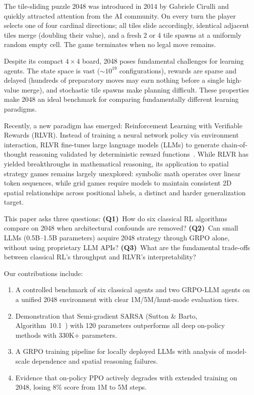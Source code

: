 \documentclass[letterpaper]{article}
\begin{document}
The tile-sliding puzzle 2048 was introduced in 2014 by Gabriele Cirulli and quickly attracted attention from the AI community. On every turn the player selects one of four cardinal directions; all tiles slide accordingly, identical adjacent tiles merge (doubling their value), and a fresh 2 or 4 tile spawns at a uniformly random empty cell. The game terminates when no legal move remains.

Despite its compact $4{\times}4$ board, 2048 poses fundamental challenges for learning agents. The state space is vast (${\sim}10^{19}$ configurations), rewards are sparse and delayed (hundreds of preparatory moves may earn nothing before a single high-value merge), and stochastic tile spawns make planning difficult. These properties make 2048 an ideal benchmark for comparing fundamentally different learning paradigms.

Recently, a new paradigm has emerged: Reinforcement Learning with Verifiable Rewards (RLVR). Instead of training a neural network policy via environment interaction, RLVR fine-tunes large language models (LLMs) to generate chain-of-thought reasoning validated by deterministic reward functions~\cite{guo2025deepseek, wen2025rlvr}. While RLVR has yielded breakthroughs in mathematical reasoning, its application to spatial strategy games remains largely unexplored: symbolic math operates over linear token sequences, while grid games require models to maintain consistent 2D spatial relationships across positional labels, a distinct and harder generalization target.

This paper asks three questions: \textbf{(Q1)}~How do six classical RL algorithms compare on 2048 when architectural confounds are removed? \textbf{(Q2)}~Can small LLMs (0.5B--1.5B parameters) acquire 2048 strategy through GRPO alone, without using proprietary LLM APIs? \textbf{(Q3)}~What are the fundamental trade-offs between classical RL's throughput and RLVR's interpretability?

Our contributions include:
\begin{enumerate}
    \item A controlled benchmark of six classical agents and two GRPO-LLM agents on a unified 2048 environment with clear 1M/5M/hunt-mode evaluation tiers.
    \item Demonstration that Semi-gradient SARSA (Sutton \& Barto, Algorithm~10.1~\cite{sutton2018rl}) with 120 parameters outperforms all deep on-policy methods with 330K+ parameters.
    \item A GRPO training pipeline for locally deployed LLMs with analysis of model-scale dependence and spatial reasoning failures.
    \item Evidence that on-policy PPO actively degrades with extended training on 2048, losing 8\% score from 1M to 5M steps.
\end{enumerate}
\end{document}
